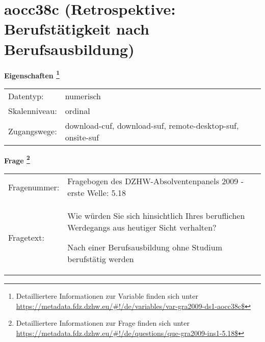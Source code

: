 
    \setcounter{footnote}{0}

    \vspace*{-1.8cm}
	\section{aocc38c (Retrospektive: Berufstätigkeit nach Berufsausbildung)}
	\label{section:aocc38c}



    \vspace*{0.5cm}
    \noindent\textbf{Eigenschaften
	\footnote{Detailliertere Informationen zur Variable finden sich unter
		\url{https://metadata.fdz.dzhw.eu/\#!/de/variables/var-gra2009-ds1-aocc38c$}}}\\
	\begin{tabularx}{\hsize}{@{}lX}
	Datentyp: & numerisch \\
	Skalenniveau: & ordinal \\
	Zugangswege: &
	  download-cuf, 
	  download-suf, 
	  remote-desktop-suf, 
	  onsite-suf
 \\
    \end{tabularx}



				\vspace*{0.5cm}
                \noindent\textbf{Frage
	                \footnote{Detailliertere Informationen zur Frage finden sich unter
		              \url{https://metadata.fdz.dzhw.eu/\#!/de/questions/que-gra2009-ins1-5.18$}}}\\
				\begin{tabularx}{\hsize}{@{}lX}
					Fragenummer: &
					  Fragebogen des DZHW-Absolventenpanels 2009 - erste Welle:
					  5.18
 \\
					Fragetext: & Wie würden Sie sich hinsichtlich Ihres beruflichen Werdegangs aus heutiger Sicht verhalten?\par  Nach einer Berufsausbildung ohne Studium berufstätig werden \\
				\end{tabularx}





